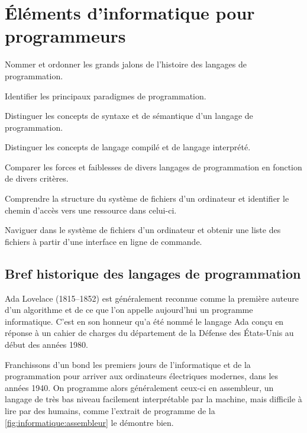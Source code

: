 
\chapter{Éléments d'informatique pour programmeurs}
\label{chap:informatique}

\begin{objectifs}
\item Nommer et ordonner les grands jalons de l'histoire des langages
  de programmation.
\item Identifier les principaux paradigmes de programmation.
\item Distinguer les concepts de syntaxe et de sémantique d'un langage
  de programmation.
\item Distinguer les concepts de langage compilé et de langage
  interprété.
\item Comparer les forces et faiblesses de divers langages de
  programmation en fonction de divers critères.
\item Comprendre la structure du système de fichiers d'un ordinateur
  et identifier le chemin d'accès vers une ressource dans celui-ci.
\item Naviguer dans le système de fichiers d'un ordinateur et obtenir
  une liste des fichiers à partir d'une interface en ligne de
  commande.
\end{objectifs}


\section{Bref historique des langages de programmation}
\label{sec:informatique:historique}

Ada Lovelace (1815--1852) est généralement reconnue comme la première
auteure d'un algorithme et de ce que l'on appelle aujourd'hui un
programme informatique. C'est en son honneur qu'a été nommé le langage
Ada conçu en réponse à un cahier de charges du département de la
Défense des États-Unis au début des années 1980.

Franchissons d'un bond les premiers jours de l'informatique et de la
programmation pour arriver aux ordinateurs électriques modernes, dans
les années 1940. On programme alors généralement ceux-ci en
assembleur, un langage de très bas niveau facilement
interprétable par la machine, mais difficile à lire par des humains,
comme l'extrait de programme de la
\autoref{fig:informatique:assembleur} le démontre bien.

